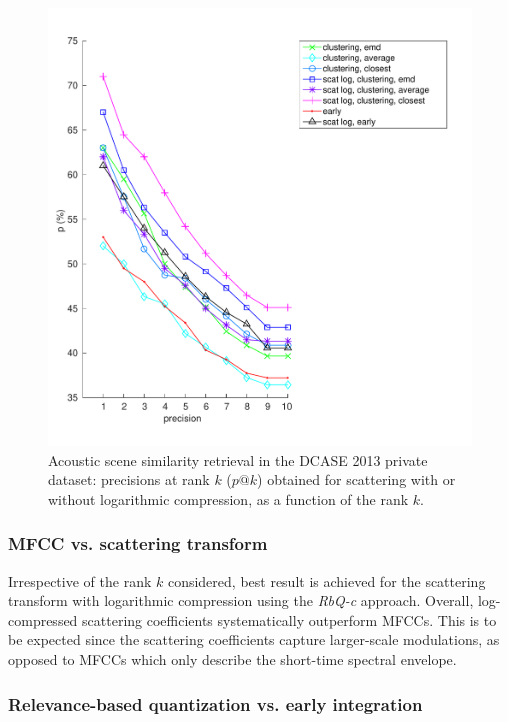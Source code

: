\documentclass[smallextended]{svjour3}
\makeatletter
\newcommand*{\vs}{vs.\@\xspace}
\makeatother
\begin{document}
\begin{figure}[t]
\begin{center}
\includegraphics[width=\columnwidth]{figures/log}
\caption{Acoustic scene similarity retrieval in the DCASE 2013 private dataset: precisions at rank $k$ ($p@k$) obtained for scattering with or without logarithmic compression, as a function of the rank $k$.}
\label{fig:ASS_0}
\end{center}
\end{figure}

\subsubsection*{MFCC \vs scattering transform}

Irrespective of the rank $k$ considered, best result is achieved for the scattering transform with logarithmic compression using the \emph{RbQ-c} approach. Overall, log-compressed scattering coefficients systematically outperform MFCCs. This is to be expected since the scattering coefficients capture larger-scale modulations, as opposed to MFCCs which only describe the short-time spectral envelope.

\subsubsection*{Relevance-based quantization \vs early integration}
\end{document}
